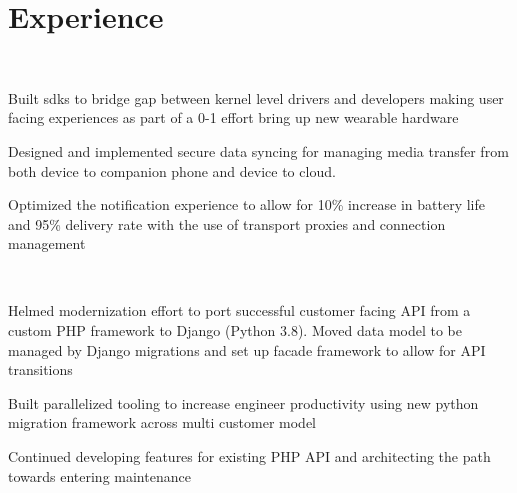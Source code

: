 \documentclass[letterpaper]{deedy-resume-openfont} %
\begin{document}
%
\begin{minipage}[t]{0.66\textwidth} %


\section{Experience}

\\

\vspace{\topsep} %
\begin{tightitemize}
\item  Built sdks to bridge gap between kernel level drivers and developers making user facing experiences as part of a 0-1 effort bring up new wearable hardware
\item Designed and implemented secure data syncing for managing media transfer from both device to companion phone and device to cloud.
\item Optimized the notification experience to allow for 10\% increase in battery life and 95\% delivery  rate with the use of transport proxies and connection management
\end{tightitemize}

\\

\begin{tightitemize}
\item Helmed modernization effort to port successful customer facing API from a custom PHP framework to Django (Python 3.8). Moved data model to be managed by Django migrations and set up facade framework to allow for API transitions
\item Built parallelized tooling to increase engineer productivity using new python migration framework across multi customer model
\item Continued developing features for existing PHP API and architecting the path towards entering maintenance
\end{tightitemize}


\end{minipage}
\end{document}
